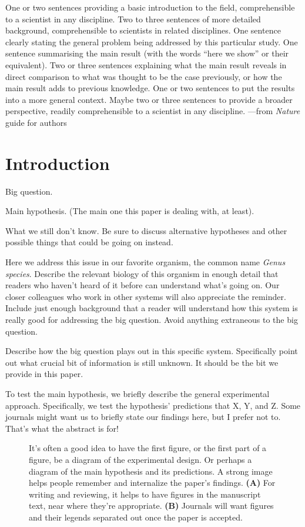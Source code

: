 \documentclass[11pt]{article}
\begin{document}
One or two sentences providing a basic introduction to the field, comprehensible to a scientist in any discipline. Two to three sentences of more detailed background, comprehensible to scientists in related disciplines. One sentence clearly stating the general problem being addressed by this particular study. One sentence summarising the main result (with the words ``here we show'' or their equivalent). Two or three sentences explaining what the main result reveals in direct comparison to what was thought to be the case previously, or how the main result adds to previous knowledge. One or two sentences to put the results into a more general context. Maybe two or three sentences to provide a broader perspective, readily comprehensible to a scientist in any discipline. ---from \textit{Nature} guide for authors




\clearpage 
\section{Introduction}

Big question. 

Main hypothesis. (The main one this paper is dealing with, at least). 

What we still don't know. Be sure to discuss alternative hypotheses and other possible things that could be going on instead. 

Here we address this issue in our favorite organism, the common name \textit{Genus species}. Describe the relevant biology of this organism in enough detail that readers who haven't heard of it before can understand what's going on. Our closer colleagues who work in other systems will also appreciate the reminder. Include just enough background that a reader will understand how this system is really good for addressing the big question. Avoid anything extraneous to the big question.

Describe how the big question plays out in this specific system. Specifically point out what crucial bit of information is still unknown. It should be the bit we provide in this paper.

To test the main hypothesis, we briefly describe the general experimental approach. Specifically, we test the hypothesis' predictions that X, Y, and Z. Some journals might want us to briefly state our findings here, but I prefer not to. That's what the abstract is for! 

\begin{figure}[p]
\caption{
It's often a good idea to have the first figure, or the first part of a figure, be a diagram of the experimental design. Or perhaps a diagram of the main hypothesis and its predictions. A strong image helps people remember and internalize the paper's findings. 
\textbf{(A)} For writing and reviewing, it helps to have figures in the manuscript text, near where they're appropriate. 
\textbf{(B)} Journals will want figures and their legends separated out once the paper is accepted. 
}
\label{fig:first-figure}
\end{figure}
\end{document}
